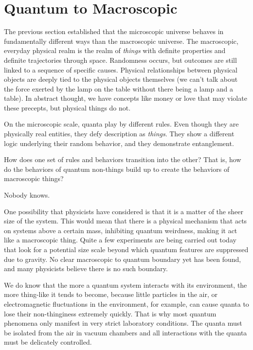 \documentclass[12pt,onecolumn,preprintnumbers,amsmath,amssymbn,reprint,nofootinbib,superscriptaddress]{revtex4}    %
\begin{document}

%
\section{Quantum to Macroscopic}

The previous section established that the microscopic universe behaves in fundamentally different ways than the macroscopic universe.  The macroscopic, everyday physical realm is the realm of {\em things} with definite properties and definite trajectories through space. Randomness occurs, but outcomes are still linked to a sequence of specific causes.  Physical relationships between physical objects are deeply tied to the physical objects themselves (we can't talk about the force exerted by the lamp on the table without there being a lamp and a table).  In abstract thought, we have concepts like money or love that may violate these precepts, but physical things do not. 

On the microscopic scale, quanta play by different rules.  Even though they are physically real entities, they defy description as {\em things}.  They show a different logic underlying their random behavior, and they demonstrate entanglement.  

How does one set of rules and behaviors transition into the other?  That is, how do the behaviors of quantum non-things build up to create the behaviors of macroscopic things?

Nobody knows.  

One possibility that physicists have considered is that it is a matter of the sheer size of the system. This would mean that there is a physical mechanism that acts on systems above a certain mass, inhibiting quantum weirdness, making it act like a macroscopic thing. Quite a few experiments are being carried out today that look for a potential size scale beyond which quantum features are suppressed due to gravity. No clear macroscopic to quantum boundary yet has been found, and many physicists believe there is no such boundary.

We do know that the more a quantum system interacts with its environment, the more thing-like it tends to become, because little particles in the air, or electromagnetic fluctuations in the environment, for example, can cause quanta to lose their non-thinginess extremely quickly. That is why most quantum phenomena only manifest in very strict laboratory conditions. The quanta must be isolated from the air in vacuum chambers and all interactions with the quanta must be delicately controlled. 
\end{document}
